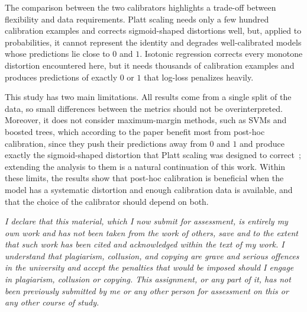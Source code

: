 \documentclass[a4paper, 10pt]{article}
\begin{document}
The comparison between the two calibrators highlights a trade-off between flexibility and data requirements. Platt scaling needs only a few hundred calibration examples and corrects sigmoid-shaped distortions well, but, applied to probabilities, it cannot represent the identity and degrades well-calibrated models whose predictions lie close to $0$ and $1$. Isotonic regression corrects every monotone distortion encountered here, but it needs thousands of calibration examples and produces predictions of exactly $0$ or $1$ that log-loss penalizes heavily.

This study has two main limitations. All results come from a single split of the data, so small differences between the metrics should not be overinterpreted. Moreover, it does not consider maximum-margin methods, such as SVMs and boosted trees, which according to the paper benefit most from post-hoc calibration, since they push their predictions away from $0$ and $1$ and produce exactly the sigmoid-shaped distortion that Platt scaling was designed to correct~\cite{niculescu2005predicting}; extending the analysis to them is a natural continuation of this work. Within these limits, the results show that post-hoc calibration is beneficial when the model has a systematic distortion and enough calibration data is available, and that the choice of the calibrator should depend on both.




\textit{I declare that this material, which I now submit for assessment, is entirely my own work and has not been taken from the work of others, save and to the extent that such work has been cited and acknowledged within the text of my work. I understand that plagiarism, collusion, and copying are grave and serious offences in the university and accept the penalties that would be imposed should I engage in plagiarism, collusion or copying. This assignment, or any part of it, has not been previously submitted by me or any other person for assessment on this or any other course of study.}
\end{document}
